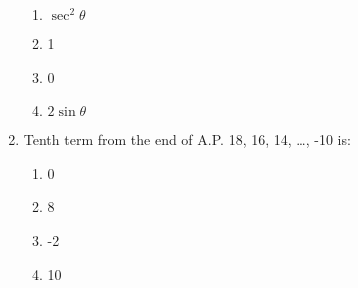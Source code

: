 \begin{enumerate}[label=(\roman*)]
        \begin{multicols}{2}
        \begin{enumerate}[label=(\alph*)]
            \item $\sec^2 \theta$
            \item 1
            \item 0
            \item $2 \sin \theta$
        \end{enumerate}
        \end{multicols}

    \item Tenth term from the end of A.P. 18, 16, 14, \dots, -10 is: 

        \begin{multicols}{2}
        \begin{enumerate}[label=(\alph*)]
            \item 0
            \item 8
            \item -2
            \item 10
        \end{enumerate}
        \end{multicols}

\end{enumerate}

